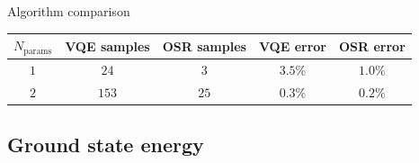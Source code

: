 \documentclass[9pt, aspectratio=169]{beamer}
\begin{document}
\begin{frame}{Algorithm comparison}
\vspace{-1em}

\begin{table}[!bp]
	\centering
	\begin{tabular}{ c c c c c }
		\hline
		$N_\text{params}$ & VQE samples & OSR samples &
		VQE error & OSR error \\
		\hline
		\hline
		$1$ & $24$ & $3$ & $3.5\%$ & $1.0\%$ \\
		\hline
		$2$ & $153$ & $25$ & $0.3\%$ & $0.2\%$ \\
		\hline
	\end{tabular}
\end{table}

\end{frame}


\subsection{Ground state energy}
\end{document}
